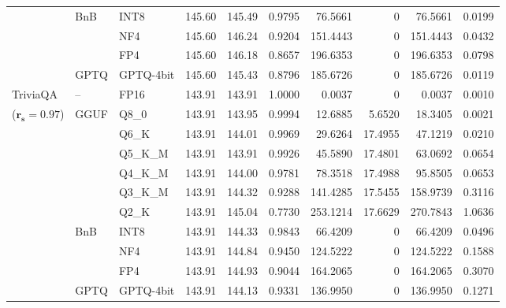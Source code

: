 \begin{longtable}{ll l rrrrrrr}
 & BnB & INT8 & 145.60 & 145.49 & 0.9795 & 76.5661 & \cellcolor{cyan!12} $0$ & 76.5661 & 0.0199 \\
 &  & NF4 & 145.60 & 146.24 & \cellcolor{red!18} 0.9204 & \cellcolor{red!18} 151.4443 & \cellcolor{cyan!12} $0$ & \cellcolor{red!18} 151.4443 & \cellcolor{red!18} 0.0432 \\
 &  & FP4 & 145.60 & 146.18 & \cellcolor{red!18} 0.8657 & \cellcolor{red!18} 196.6353 & \cellcolor{cyan!12} $0$ & \cellcolor{red!18} 196.6353 & \cellcolor{red!18} 0.0798 \\
 & GPTQ & GPTQ-4bit & 145.60 & 145.43 & \cellcolor{red!18} 0.8796 & \cellcolor{red!18} 185.6726 & \cellcolor{cyan!12} $0$ & \cellcolor{red!18} 185.6726 & \cellcolor{red!18} 0.0119 \\
\midrule
TriviaQA & -- & FP16 & 143.91 & 143.91 & 1.0000 & 0.0037 & \cellcolor{cyan!12} $0$ & 0.0037 & 0.0010 \\
{\small ($\mathbf{r_s{=}0.97}$)} & GGUF & Q8\_0 & 143.91 & 143.95 & 0.9994 & 12.6885 & 5.6520 & 18.3405 & 0.0021 \\
 &  & Q6\_K & 143.91 & 144.01 & 0.9969 & 29.6264 & 17.4955 & 47.1219 & 0.0210 \\
 &  & Q5\_K\_M & 143.91 & 143.91 & 0.9926 & 45.5890 & 17.4801 & 63.0692 & 0.0654 \\
 &  & Q4\_K\_M & 143.91 & 144.00 & 0.9781 & 78.3518 & 17.4988 & 95.8505 & 0.0653 \\
 &  & Q3\_K\_M & 143.91 & 144.32 & \cellcolor{red!18} 0.9288 & \cellcolor{red!18} 141.4285 & 17.5455 & \cellcolor{red!18} 158.9739 & \cellcolor{red!18} 0.3116 \\
 &  & Q2\_K & 143.91 & 145.04 & \cellcolor{red!35} 0.7730 & \cellcolor{red!35} 253.1214 & 17.6629 & \cellcolor{red!35} 270.7843 & \cellcolor{red!35} 1.0636 \\
 & BnB & INT8 & 143.91 & 144.33 & 0.9843 & 66.4209 & \cellcolor{cyan!12} $0$ & 66.4209 & 0.0496 \\
 &  & NF4 & 143.91 & 144.84 & \cellcolor{red!18} 0.9450 & \cellcolor{red!18} 124.5222 & \cellcolor{cyan!12} $0$ & \cellcolor{red!18} 124.5222 & \cellcolor{red!18} 0.1588 \\
 &  & FP4 & 143.91 & 144.93 & \cellcolor{red!18} 0.9044 & \cellcolor{red!18} 164.2065 & \cellcolor{cyan!12} $0$ & \cellcolor{red!18} 164.2065 & \cellcolor{red!18} 0.3070 \\
 & GPTQ & GPTQ-4bit & 143.91 & 144.13 & \cellcolor{red!18} 0.9331 & \cellcolor{red!18} 136.9950 & \cellcolor{cyan!12} $0$ & \cellcolor{red!18} 136.9950 & \cellcolor{red!18} 0.1271 \\

\end{longtable}

